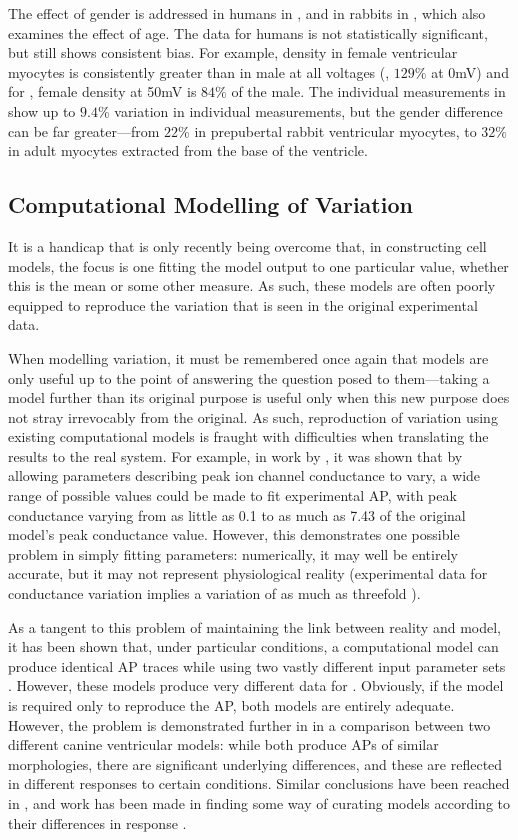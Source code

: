 \documentclass[../thesis-main.tex]{subfiles}
\begin{document}
 The effect of gender is addressed in humans in \citet{Verkerk2005}, and in rabbits in \citet{Sims2008}, which also examines the effect of age. The data for humans is not statistically significant, but still shows consistent bias. For example, \ica{} density in female ventricular myocytes is consistently greater than in male at all voltages (\eg, $129\%$ at 0mV) and for \ito{}, female \ito{} density at 50mV is $84\%$ of the male. The individual measurements in \citet{Sims2008} show up to $9.4\%$ variation in individual measurements, but the gender difference can be far greater---from $22\%$ in prepubertal rabbit ventricular myocytes, to $32\%$ in adult myocytes extracted from the base of the ventricle.
 
 \subsection{Computational Modelling of Variation}
 \label{subsec:comp-var}
 It is a handicap that is only recently being overcome that, in constructing cell models, the focus is one fitting the model output to one particular value, whether this is the mean or some other measure. As such, these models are often poorly equipped to reproduce the variation that is seen in the original experimental data.
 
 When modelling variation, it must be remembered once again that models are only useful up to the point of answering the question posed to them---taking a model further than its original purpose is useful only when this new purpose does not stray irrevocably from the original. As such, reproduction of variation using existing computational models is fraught with difficulties when translating the results to the real system. For example, in work by \citet{Davies2012}, it was shown that by allowing parameters describing peak ion channel conductance to vary, a wide range of possible values could be made to fit experimental AP, with peak conductance varying from as little as 0.1 to as much as 7.43 of the original model's peak conductance value. However, this demonstrates one possible problem in simply fitting parameters: numerically, it may well be entirely accurate, but it may not represent physiological reality (experimental data for conductance variation implies a variation of as much as threefold \citep{Schulz2006}).
 
 As a tangent to this problem of maintaining the link between reality and model, it has been shown that, under particular conditions, a computational model can produce identical AP traces while using two vastly different input parameter sets \citep{Sarkar2010}. However, these models produce very different data for \cai{}. Obviously, if the model is required only to reproduce the AP, both models are entirely adequate. However, the problem is demonstrated further in \citet{Cherry2007} in a comparison between two different canine ventricular models: while both produce APs of similar morphologies, there are significant underlying differences, and these are reflected in different responses to certain conditions. Similar conclusions have been reached in \citet{Romero2011}, and work has been made in finding some way of curating models according to their differences in response \citep{Terkildsen2008, Cooper2011}.
 
\end{document}
